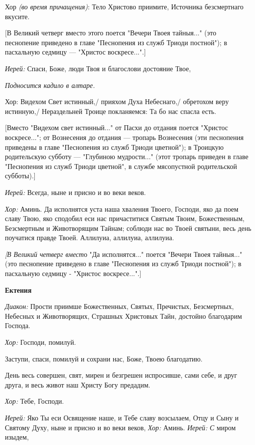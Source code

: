  Хор {\itshape (во время причащения)}: Тело Христово приимите, Источника безсмертнаго вкусите. 

 [В Великий четверг вместо этого поется "Вечери Твоея тайныя..." (это песнопение приведено в главе "Песнопения из служб Триоди постной"); в пасхальную седмицу — "Христос воскресе...".] 

 {\itshape Иерей:} Спаси, Боже, люди Твоя и благослови достояние Твое, 

 {\itshape Подносится кадило в алтаре.} 

       Хор: Видехом Свет истинный,/ прияхом Духа Небеснаго,/ обретохом веру истинную,/ Нераздельней Троице покланяемся: Та бо нас спасла есть.

       [Вместо "Видехом свет истинный..." от Пасхи до отдания поется "Христос воскресе..."; от Вознесения до отдания — тропарь Вознесения (эти песнопения приведены в главе "Песнопения из служб Триоди цветной"); в Троицкую родительскую субботу — "Глубиною мудрости..." (этот тропарь приведен в главе "Песнопения из служб Триоди цветной", в службе мясопустной родительской субботы).]

 {\itshape  Иерей:} Всегда, ныне и присно и во веки веков.

 {\itshape  Хор:} Аминь. Да исполнятся уста наша хваления Твоего, Господи, яко да поем славу Твою, яко сподобил еси нас причаститися Святым Твоим, Божественным, Безсмертным и Животворящим Тайнам; соблюди нас во Твоей святыни, весь день поучатися правде Твоей. Аллилуиа, аллилуиа, аллилуиа. 

 {\itshape [В Великий четверг вмест}о "Да исполнятся..." поется "Вечери Твоея тайныя..." (это песнопение приведено в главе "Песнопения из служб Триоди постной"); в пасхальную седмицу - "Христос воскресе...".] 

\medskip 

 {\bfseries Ектения }

 {\itshape  Диакон:} Прости приимше Божественных, Святых, Пречистых, Безсмертных, Небесных и Животворящих, Страшных Христовых Тайн, достойно благодарим Господа. 

{\itshape    Хор:} Господи, помилуй. 

   Заступи, спаси, помилуй и сохрани нас, Боже, Твоею благодатию. 

   День весь совершен, свят, мирен и безгрешен испросивше, сами себе, и друг друга, и весь живот наш Христу Богу предадим. 

{\itshape    Хор:} Тебе, Господи. 

 {\itshape Иерей:} Яко Ты еси Освящение наше, и Тебе славу возсылаем, Отцу и Сыну и Святому Духу, ныне и присно и во веки веков, {\itshape  Хор:} Аминь. {\itshape  Иерей: С} миром изыдем, 

